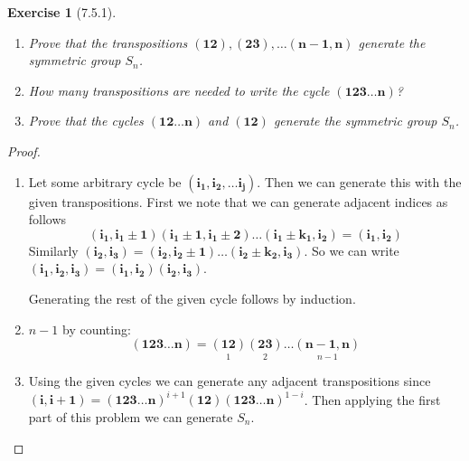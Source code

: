 \documentclass[12pt]{article}
\newtheorem*{exer}{Exercise}
\newcommand{\cycle}[1]{(\mathbf{#1})}
\begin{document}
\begin{exer}[7.5.1]

    \begin{enumerate}
        \item Prove that the transpositions $\cycle{12}, \cycle{23},
            \dots \cycle{n - 1, n}$ generate the symmetric group $S_n$. 

        \item How many transpositions are needed to write the cycle
            $\cycle{123 \dots n}$?

        \item Prove that the cycles $\cycle{12 \dots n}$ and
            $\cycle{12}$ generate the symmetric group $S_n$.
    \end{enumerate}

\end{exer}

\begin{proof}

    \begin{enumerate}
        \item Let some arbitrary cycle be $\cycle{i_1, i_2, \dots i_j}$.
            Then we can generate this with the given transpositions.
            First we note that we can generate adjacent indices as
            follows
            \[
                \cycle{i_1, i_1 \pm 1} \cycle{i_1 \pm 1, i_1 \pm 2}
                \dots \cycle{i_1 \pm k_1, i_2} = \cycle{i_1, i_2}
            \]
            Similarly $\cycle{i_2, i_3} = \cycle{i_2, i_2 \pm 1}
            \dots \cycle{i_2 \pm k_2, i_3}$. So we can write
            $\cycle{i_1, i_2, i_3} = \cycle{i_1, i_2} \cycle{i_2, i_3}$.

            Generating the rest of the given cycle follows by induction.

        \item $n - 1$ by counting: 
            \[
                \cycle{123 \dots n} = \underset{1}{\cycle{12}}
                \underset{2}{\cycle{23}} \dots \underset{n-1}{\cycle{n-1,
                n}}
            \]

        \item Using the given cycles we can generate any adjacent
            transpositions since  $\cycle{i, i+1} = \cycle{123 \dots
            n}^{i+1} \cycle{12} \cycle{123 \dots n}^{1-i}$. Then
            applying the first part of this problem we can generate
            $S_n$.

    \end{enumerate}

\end{proof}

\end{document}
